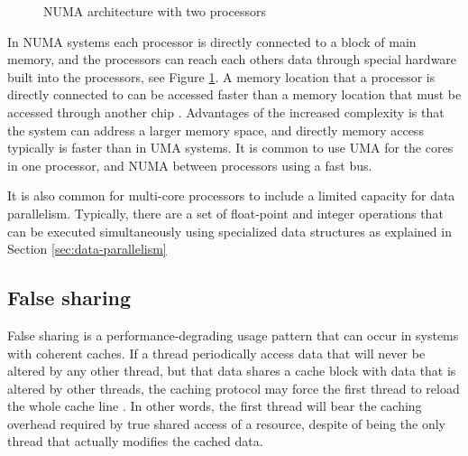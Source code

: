 \documentclass[12pt,a4paper,twoside]{report}
\begin{document}
{\begin{figure}[H]
		\caption{NUMA architecture with two processors}
		\label{fig:numa-arch}
	\end{figure}

} %

In NUMA systems each processor is directly connected to a block of
main memory, and the processors can reach each others data through
special hardware built into the processors, see Figure
\ref{fig:numa-arch}. A memory location that a processor is directly
connected to can be accessed faster than a memory location that must
be accessed through another chip \cite{pacheco}. Advantages of the
increased complexity is that the system can address a larger memory
space, and directly memory access typically is faster than in UMA
systems. It is common to use UMA for the cores in one processor, and
NUMA between processors using a fast bus.

It is also common for multi-core processors to include a limited
capacity for data parallelism. Typically, there are a set of
float-point and integer operations that can be executed simultaneously
using specialized data structures as explained in Section
\ref{sec:data-parallelism}

\subsection{False sharing}
\label{sec:false-sharing}

False sharing is a performance-degrading usage pattern that can occur
in systems with coherent caches. If a thread periodically access data
that will never be altered by any other thread, but that data shares a
cache block with data that is altered by other threads, the caching
protocol may force the first thread to reload the whole cache line
\cite{scott1993false}. In other words, the first thread will bear the
caching overhead required by true shared access of a resource, despite
of being the only thread that actually modifies the cached data.
\end{document}

